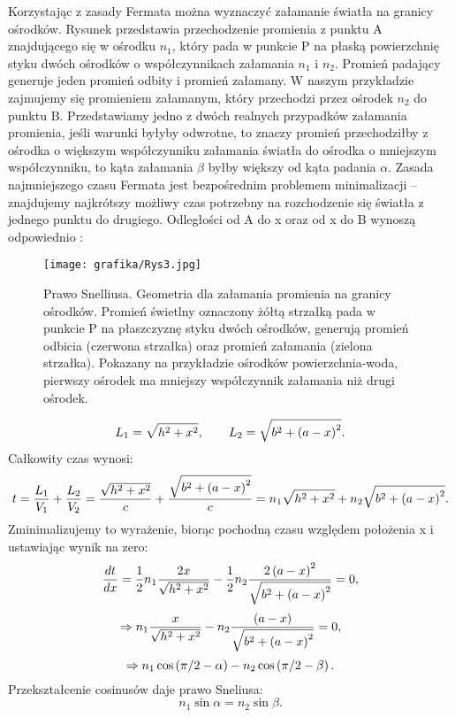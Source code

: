


\indent Korzystając z zasady Fermata można wyznaczyć załamanie światła na granicy ośrodków. Rysunek  przedstawia przechodzenie promienia z punktu A znajdującego się w ośrodku $n_1$, który pada w punkcie P na płaską powierzchnię styku dwóch ośrodków o współczynnikach załamania $n_1$ i $n_2$. Promień padający generuje jeden promień odbity i promień załamany. W naszym przykładzie zajmujemy się promieniem załamanym, który przechodzi przez ośrodek $n_2$ do punktu B. Przedstawiamy jedno z dwóch realnych przypadków załamania promienia, jeśli warunki byłyby odwrotne, to znaczy promień przechodziłby z ośrodka o większym współczynniku załamania światła do ośrodka o mniejszym współczynniku, to kąta załamania $\beta$ byłby większy od kąta padania $\alpha$. Zasada najmniejszego czasu Fermata jest bezpośrednim problemem minimalizacji -- znajdujemy najkrótszy możliwy czas potrzebny na rozchodzenie się światła z jednego punktu do drugiego. Odległości od A do x oraz od x do B wynoszą odpowiednio \cite{gregschool}:

\begin{figure}[htb]
    \centering
    \texttt{[image: grafika/Rys3.jpg]}
    \caption{\label{fig:PrawoSneliusa} Prawo Snelliusa. Geometria dla załamania promienia na granicy ośrodków. Promień świetlny oznaczony żółtą strzałką pada w punkcie P na płaszczyznę styku dwóch ośrodków, generują promień odbicia (czerwona strzałka) oraz promień załamania (zielona strzałka). Pokazany na przykładzie ośrodków powierzchnia-woda, pierwszy ośrodek ma mniejszy współczynnik załamania niż drugi ośrodek.}
\end{figure}
%
$$L_{1}=\sqrt{h^{2}+x^{2}},\qquad L_{2}=\sqrt{b^{2}+\left({a-x}\right)^{2}}.$$
%
Całkowity czas wynosi:
%
$$t=\frac{L_1}{V_1}+\frac{L_2}{V_2}=\frac{\sqrt{h^{2}+x^{2}}}{c}+\frac{\sqrt{b^{2}+\left({a-x}\right)^{2}}}{c}=n_{1}\sqrt{h^{2}+x^{2}}+n_{2}\sqrt{b^{2}+\left({a-x}\right)^{2}}.$$
%
Zminimalizujemy to wyrażenie, biorąc pochodną czasu względem położenia x i ustawiając wynik na zero:
%
$$\frac{dt}{dx}=\frac{1}{2}n_{1}\frac{2x}{\sqrt{h^{2}+x^{2}}}-\frac{1}{2}n_{2}\frac{2\left({a-x}\right)^{2}}{\sqrt{b^{2}+\left({a-x}\right)^{2}}}=0,$$
%
$$\Rightarrow n_{1}\frac{x}{\sqrt{h^{2}+x^{2}}}-n_{2}\frac{\left({a-x}\right)}{\sqrt{b^{2}+\left({a-x}\right)^{2}}}=0,$$
%
$$\Rightarrow n_{1}\cos\left({\pi /2-\alpha}\right)-n_{2}\cos\left({\pi /2-\beta}\right).$$
Przekształcenie cosinusów daje prawo Sneliusa:
%
$$n_{1}\sin\alpha=n_{2}\sin\beta.$$
